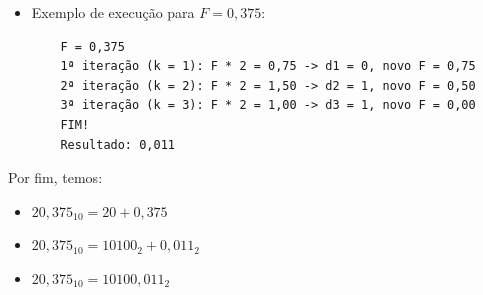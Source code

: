 \documentclass[12pt]{article}
\begin{document}
\begin{itemize}
\begin{verbatim}
    do
        F := F * 2;
        dk := parte_inteira(F);
        F := F - dk;
        k := k + 1;
    while (F > 0);
    \end{verbatim}
    \item [""] Exemplo de execução para $F = 0,375$:
    \begin{verbatim}
    F = 0,375
    1ª iteração (k = 1): F * 2 = 0,75 -> d1 = 0, novo F = 0,75
    2ª iteração (k = 2): F * 2 = 1,50 -> d2 = 1, novo F = 0,50
    3ª iteração (k = 3): F * 2 = 1,00 -> d3 = 1, novo F = 0,00
    FIM!
    Resultado: 0,011
    \end{verbatim}
\end{itemize}

\newpage
\noindent
Por fim, temos:
\begin{itemize}
    \item [""] $20,375_{10} = 20 + 0,375$
    \item [""] $20,375_{10} = 10100_{2} + 0,011_{2}$
    \item [""] $20,375_{10} = 10100,011_{2}$
\end{itemize}
\end{document}
